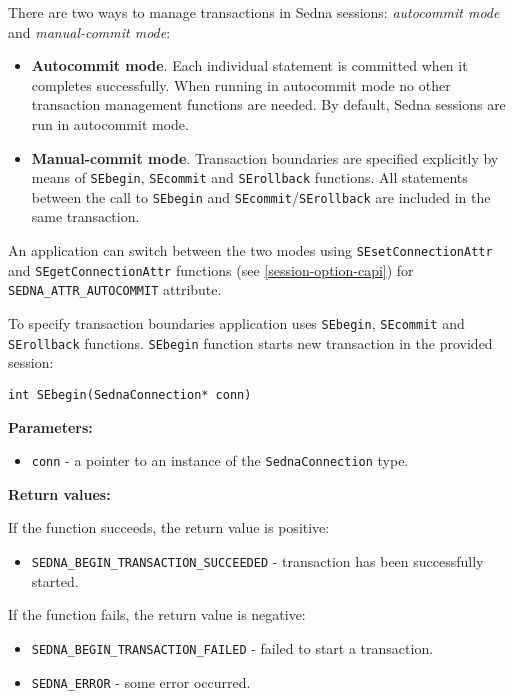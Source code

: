 \documentclass[a4paper,12pt]{article}
\newenvironment{citemize}
{\begin{itemize}
  \setlength{\itemsep}{0pt}
  \setlength{\parskip}{0pt}
  \setlength{\parsep}{0pt}}
{\end{itemize}}
\begin{document}
There are two ways to manage transactions in Sedna sessions: \emph{autocommit
mode} and \emph{manual-commit mode}:

\begin{itemize}
\item\textbf{Autocommit mode}. Each individual statement is committed when it
completes successfully. When running in autocommit mode no other transaction
management functions are needed. By default, Sedna sessions are run in
autocommit mode.
\item\textbf{Manual-commit mode}. Transaction boundaries are specified
explicitly by means of \verb!SEbegin!, \verb!SEcommit! and \verb!SErollback!
functions. All statements between the call to \verb!SEbegin! and
\verb!SEcommit!/\verb!SErollback! are included in the same transaction.
\end{itemize}

An application can switch between the two modes using \verb!SEsetConnectionAttr!
and \verb!SEgetConnectionAttr! functions (see \ref{session-option-capi}) for
\verb!SEDNA_ATTR_AUTOCOMMIT! attribute.

To specify transaction boundaries application uses \verb!SEbegin!,
\verb!SEcommit! and \verb!SErollback! functions. \verb!SEbegin! function starts
new transaction in the provided session:

\begin{verbatim}
int SEbegin(SednaConnection* conn)
\end{verbatim}

\noindent
\textbf{Parameters:}

\begin{citemize}
\item\verb!conn! - a pointer to an instance of the \verb!SednaConnection! type.
\end{citemize}

\noindent
\textbf{Return values:}

\medskip

\noindent
If the function succeeds, the return value is positive:

\begin{citemize}
\item\verb!SEDNA_BEGIN_TRANSACTION_SUCCEEDED! - transaction has been
successfully started.
\end{citemize}

\noindent
If the function fails, the return value is negative:

\begin{citemize}
\item\verb!SEDNA_BEGIN_TRANSACTION_FAILED! - failed to start a transaction.
\item\verb!SEDNA_ERROR! - some error occurred.
\end{citemize}
\end{document}
